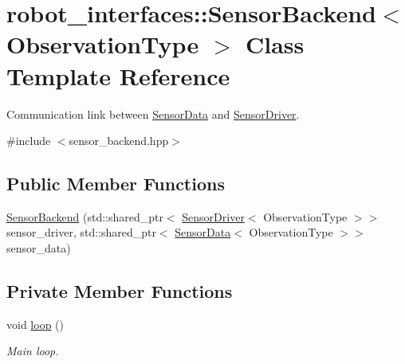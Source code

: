 \hypertarget{classrobot__interfaces_1_1SensorBackend}{}\section{robot\+\_\+interfaces\+:\+:Sensor\+Backend$<$ Observation\+Type $>$ Class Template Reference}
\label{classrobot__interfaces_1_1SensorBackend}


Communication link between \hyperlink{classrobot__interfaces_1_1SensorData}{Sensor\+Data} and \hyperlink{classrobot__interfaces_1_1SensorDriver}{Sensor\+Driver}.  




{\ttfamily \#include $<$sensor\+\_\+backend.\+hpp$>$}

\subsection*{Public Member Functions}
\begin{DoxyCompactItemize}
\item 
\hyperlink{classrobot__interfaces_1_1SensorBackend_af24fda0e1d54274cf8122195f82acea9}{Sensor\+Backend} (std\+::shared\+\_\+ptr$<$ \hyperlink{classrobot__interfaces_1_1SensorDriver}{Sensor\+Driver}$<$ Observation\+Type $>$$>$ sensor\+\_\+driver, std\+::shared\+\_\+ptr$<$ \hyperlink{classrobot__interfaces_1_1SensorData}{Sensor\+Data}$<$ Observation\+Type $>$$>$ sensor\+\_\+data)
\end{DoxyCompactItemize}
\subsection*{Private Member Functions}
\begin{DoxyCompactItemize}
\item 
void \hyperlink{classrobot__interfaces_1_1SensorBackend_aee2c015c331cf8acd80b57523f10beaa}{loop} ()\hypertarget{classrobot__interfaces_1_1SensorBackend_aee2c015c331cf8acd80b57523f10beaa}{}\label{classrobot__interfaces_1_1SensorBackend_aee2c015c331cf8acd80b57523f10beaa}

\begin{DoxyCompactList}\small\item\em Main loop. \end{DoxyCompactList}\end{DoxyCompactItemize}
